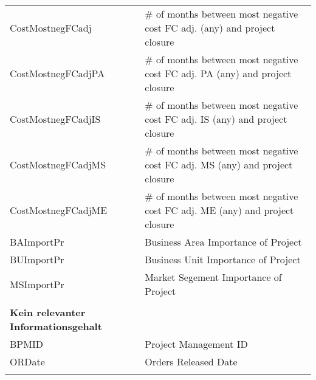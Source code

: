 \begin{longtable}[ht]{p{} p{}}
	CostMostnegFCadj & \# of months between most negative cost FC adj. (any) and project closure \\
	CostMostnegFCadjPA & \# of months between most negative cost FC adj. PA (any) and project closure \\
	CostMostnegFCadjIS & \# of months between most negative cost FC adj. IS (any) and project closure \\
	CostMostnegFCadjMS & \# of months between most negative cost FC adj. MS (any) and project closure \\
	CostMostnegFCadjME & \# of months between most negative cost FC adj. ME (any) and project closure \\
	BAImportPr & Business Area Importance of Project \\
	BUImportPr & Business Unit Importance of Project \\
	MSImportPr & Market Segement Importance  of Project \\
	&\\
	\textbf{Kein relevanter Informationsgehalt} & \\\hline
	BPMID & Project Management ID \\
	ORDate & Orders Released Date \\
	\label{tab:addlabel}%
\end{longtable}%
\newpage
